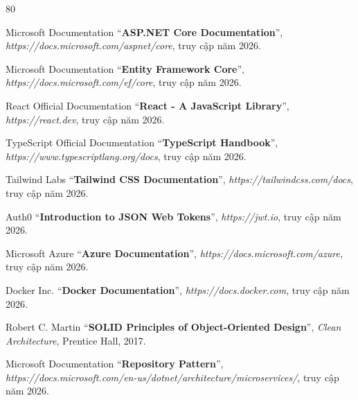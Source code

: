 \documentclass[a4paper]{article}
\begin{document}
\begin{thebibliography}{80}

Microsoft Documentation
``\textbf{ASP.NET Core Documentation}'',
\textit{https://docs.microsoft.com/aspnet/core}, truy cập năm 2026.

Microsoft Documentation
``\textbf{Entity Framework Core}'',
\textit{https://docs.microsoft.com/ef/core}, truy cập năm 2026.

React Official Documentation
``\textbf{React - A JavaScript Library}'',
\textit{https://react.dev}, truy cập năm 2026.

TypeScript Official Documentation
``\textbf{TypeScript Handbook}'',
\textit{https://www.typescriptlang.org/docs}, truy cập năm 2026.

Tailwind Labs
``\textbf{Tailwind CSS Documentation}'',
\textit{https://tailwindcss.com/docs}, truy cập năm 2026.

Auth0
``\textbf{Introduction to JSON Web Tokens}'',
\textit{https://jwt.io}, truy cập năm 2026.

Microsoft Azure
``\textbf{Azure Documentation}'',
\textit{https://docs.microsoft.com/azure}, truy cập năm 2026.

Docker Inc.
``\textbf{Docker Documentation}'',
\textit{https://docs.docker.com}, truy cập năm 2026.

Robert C. Martin
``\textbf{SOLID Principles of Object-Oriented Design}'',
\textit{Clean Architecture}, Prentice Hall, 2017.

Microsoft Documentation
``\textbf{Repository Pattern}'',
\textit{https://docs.microsoft.com/en-us/dotnet/architecture/microservices/}, truy cập năm 2026.

\end{thebibliography}
\end{document}
